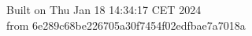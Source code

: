 {\noindent Built on Thu Jan 18 14:34:17 CET 2024} \\ 
 {\noindent from 6e289c68be226705a30f7454f02edfbae7a7018a}
